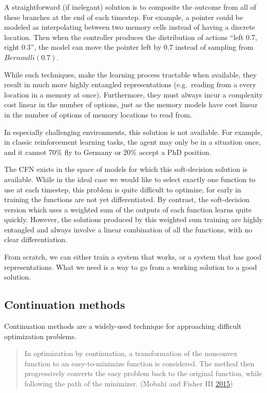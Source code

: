 \documentclass[12pt,twoside]{mitthesis}
\begin{document}
A straightforward (if inelegant) solution is to composite the outcome
from all of these branches at the end of each timestep. For example, a
pointer could be modeled as interpolating between two memory cells
instead of having a discrete location. Then when the controller produces
the distribution of actions ``left 0.7, right 0.3'', the model can move
the pointer left by 0.7 instead of sampling from \(Bernoulli(0.7)\).

While such techniques, make the learning process tractable when
available, they result in much more highly entangled representations
(e.g.~reading from a every location in a memory at once). Furthermore,
they must always incur a complexity cost linear in the number of
options, just as the memory models have cost linear in the number of
options of memory locations to read from.

In especially challenging environments, this solution is not available.
For example, in classic reinforcement learning tasks, the agent may only
be in a situation once, and it cannot 70\% fly to Germany or 20\% accept
a PhD position.

The CFN exists in the space of models for which this soft-decision
solution is available. While in the ideal case we would like to select
exactly one function to use at each timestep, this problem is quite
difficult to optimize, for early in training the functions are not yet
differentiated. By contrast, the soft-decision version which uses a
weighted sum of the outputs of each function learns quite quickly.
However, the solutions produced by this weighted sum training are highly
entangled and always involve a linear combination of all the functions,
with no clear differentiation.

From scratch, we can either train a system that works, or a system that
has good representations. What we need is a way to go from a working
solution to a good solution.

\subsection{Continuation methods}\label{sec:continuation}

Continuation methods are a widely-used technique for approaching
difficult optimization problems.

\begin{quote}
In optimization by continuation, a transformation of the nonconvex
function to an easy-to-minimize function is considered. The method then
progressively converts the easy problem back to the original function,
while following the path of the minimizer. (Mobahi and Fisher III
\protect\hyperlink{ref-mobahi2015theoretical}{2015})
\end{quote}
\end{document}
